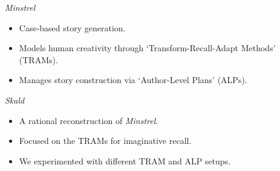 \documentclass[xcolor=x11names]{beamer}
\def\minstrel/{\textit{Minstrel}}
\def\skald/{\textit{Skald}}
\begin{document}
\begin{frame}{\minstrel/}
  \vfill
  \begin{itemize}\addtolength{\itemsep}{0.5\baselineskip}
    \item Case-based story generation.
    \item Models human creativity through `Transform-Recall-Adapt Methods' (TRAMs).
    \item Manages story construction via `Author-Level Plans' (ALPs).
  \end{itemize}
  \vfill
  \centering
  \tiny
\end{frame}

\begin{frame}{\skald/}
  \vfill
  \begin{itemize}\addtolength{\itemsep}{0.5\baselineskip}
    \item A rational reconstruction of \minstrel/.
    \item Focused on the TRAMs for imaginative recall.
    \item We experimented with different TRAM and ALP setups.
  \end{itemize}
  \vfill
  \centering
  \tiny
\end{frame}
\end{document}
